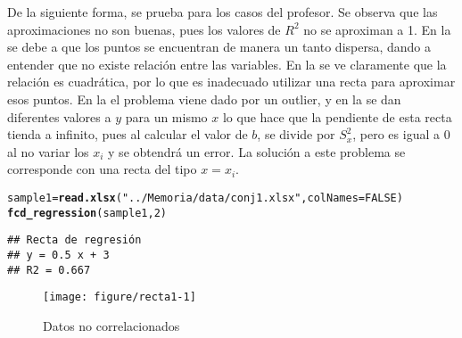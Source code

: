 \documentclass[12pt]{report}\usepackage[]{graphicx}\usepackage[dvipsnames]{xcolor}
\makeatletter
\def\maxwidth{ %
  \ifdim\Gin@nat@width>\linewidth
    \linewidth
  \else
    \Gin@nat@width
  \fi
}
\newcommand{\hlnum}[1]{\textcolor[rgb]{0.686,0.059,0.569}{#1}}%
\newcommand{\hlstr}[1]{\textcolor[rgb]{0.192,0.494,0.8}{#1}}%
\newcommand{\hlstd}[1]{\textcolor[rgb]{0.345,0.345,0.345}{#1}}%
\newcommand{\hlkwb}[1]{\textcolor[rgb]{0.69,0.353,0.396}{#1}}%
\newcommand{\hlkwc}[1]{\textcolor[rgb]{0.333,0.667,0.333}{#1}}%
\newcommand{\hlkwd}[1]{\textcolor[rgb]{0.737,0.353,0.396}{\textbf{#1}}}%
\newenvironment{kframe}{%
 \def\at@end@of@kframe{}%
 \ifinner\ifhmode%
  \def\at@end@of@kframe{\end{minipage}}%
  \begin{minipage}{\columnwidth}%
 \fi\fi%
 \def\FrameCommand##1{\hskip\@totalleftmargin \hskip-\fboxsep
 \colorbox{shadecolor}{##1}\hskip-\fboxsep
     \hskip-\linewidth \hskip-\@totalleftmargin \hskip\columnwidth}%
 \MakeFramed {\advance\hsize-\width
   \@totalleftmargin\z@ \linewidth\hsize
   \@setminipage}}%
 {\par\unskip\endMakeFramed%
 \at@end@of@kframe}
\newenvironment{knitrout}{}{} %
\makeatother
\begin{document}
 				De la siguiente forma, se prueba para los casos del profesor. Se observa que las aproximaciones no son buenas, pues los valores de $R^2$ no se aproximan a 1. En la  se debe a que los puntos se encuentran de manera un tanto dispersa, dando a entender que no existe relación entre las variables. En la  se ve claramente que la relación es cuadrática, por lo que es inadecuado utilizar una recta para aproximar esos puntos. En la  el problema viene dado por un outlier, y en la  se dan diferentes valores a $y$ para un mismo $x$ lo que hace que la pendiente de esta recta tienda a infinito, pues al calcular el valor de $b$, se divide por $S^2_x$, pero es igual a 0 al no variar los $x_i$ y se obtendrá un error. La solución a este problema se corresponde con una recta del tipo $x=x_i$. 
 				
\begin{knitrout}
\color{fgcolor}\begin{kframe}
\begin{alltt}
\hlstd{sample1} \hlkwb{=} \hlkwd{read.xlsx}\hlstd{(}\hlstr{"../Memoria/data/conj1.xlsx"}\hlstd{,} \hlkwc{colNames}\hlstd{=}\hlnum{FALSE}\hlstd{)}
\hlkwd{fcd_regression}\hlstd{(sample1,} \hlnum{2}\hlstd{)}
\end{alltt}
\begin{verbatim}
## Recta de regresión
## y = 0.5 x + 3 
## R2 = 0.667
\end{verbatim}
\end{kframe}\begin{figure}[H]

{\centering \texttt{[image: figure/recta1-1]} 

}

\caption[Datos no correlacionados]{Datos no correlacionados}\label{fig:recta1}
\end{figure}

\end{knitrout}
 				
\end{document}
